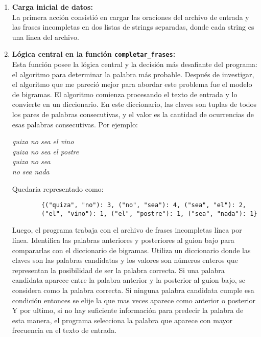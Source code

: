 \documentclass{article}
\begin{document}
\begin{enumerate}
    \item \textbf{Carga inicial de datos:} \\
    La primera acción consistió en cargar las oraciones del archivo de entrada y las frases incompletas en
     dos listas de strings separadas, donde cada string es una linea del archivo.
    
    \item \textbf{Lógica central en la función \texttt{completar\_frases}:} \\
    Esta función posee la lógica central y la decisión más desafiante del programa: el algoritmo para determinar la palabra 
    más probable. Después de investigar, el algoritmo que me pareció mejor para abordar este problema fue el
    modelo de bigramas. 
    El algoritmo comienza procesando el texto de entrada y lo convierte en un diccionario. En este diccionario,
     las claves son tuplas de todos los pares de palabras consecutivas, y el valor es la cantidad de
      ocurrencias de esas palabras consecutivas. Por ejemplo:


    
    \begin{center}
        \centering
        \textit{quiza no sea el vino} \\
        \textit{quiza no sea el postre} \\
        \textit{quiza no sea} \\
        \textit{no sea nada}
    \end{center}

    Quedaria representado como:

    \begin{verbatim}
        {("quiza", "no"): 3, ("no", "sea"): 4, ("sea", "el"): 2, 
        ("el", "vino"): 1, ("el", "postre"): 1, ("sea", "nada"): 1}
    \end{verbatim}

    Luego, el programa trabaja con el archivo de frases incompletas línea por línea. Identifica las
     palabras anteriores y posteriores al guion bajo para compararlas con el diccionario de bigramas.
      Utiliza un diccionario donde las claves son las palabras candidatas y los valores son números
       enteros que representan la posibilidad de ser la palabra correcta.
       Si una palabra candidata aparece entre la palabra anterior y la posterior al guion bajo, se
        considera como la palabra correcta. 
        Si ninguna palabra candidata cumple esa condición entonces se elije la que mas veces aparece
        como anterior o posterior
        Y por ultimo, si no hay suficiente información para 
        predecir la palabra de esta manera, el programa selecciona la palabra que aparece con mayor
         frecuencia en el texto de entrada.



\end{enumerate}
\end{document}
